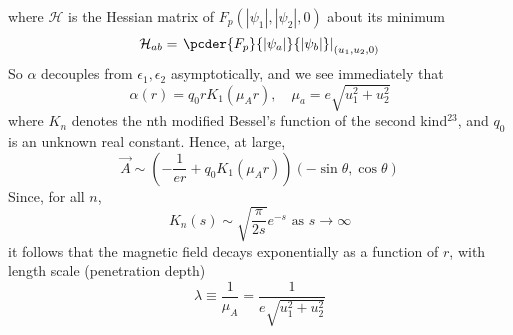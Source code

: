 where \( \mathcal{H} \) is the Hessian matrix of 
\( F_p(|\psi_1|, |\psi_2|, 0) \) about its minimum 
\begin{equation}
    \mathcal{H}_{ab} = \left. \pcder{F_p}{|\psi_a|}{|\psi_b|} 
        \right|_{(u_1, u_2, 0)}
    \label{eq:12}
\end{equation}
So \( \alpha \) decouples from \( \epsilon_1, \epsilon_2\) asymptotically, and 
we see immediately that
\begin{equation}
    \alpha(r) = q_0 r K_1(\mu_A r), \quad
    \mu_a = e\sqrt{u_1^2 + u_2^2}
    \label{eq:13}
\end{equation}
where \( K_n \) denotes the nth modified Bessel’s function of the second 
kind\( ^{23} \), and \( q_0 \) is an unknown real constant. Hence, at large,
\begin{equation}
    \vec{A} \sim \left( -\frac{1}{er} + q_0 K_1(\mu_A r) \right)
        (-\sin\theta, \cos\theta)
    \label{eq:14}
\end{equation}
Since, for all \( n \), 
\begin{equation}
    K_n(s) \sim \sqrt{\frac{\pi}{2s}}e^{-s} \text{ as } s \rightarrow \infty
    \label{eq:15}
\end{equation}
it follows that the magnetic field decays exponentially as a function of 
\( r \), with length scale (penetration depth)
\begin{equation}
    \lambda \equiv \frac{1}{\mu_A} = \frac{1}{e\sqrt{u_1^2 + u_2^2}}
    \label{eq:16}
\end{equation}

